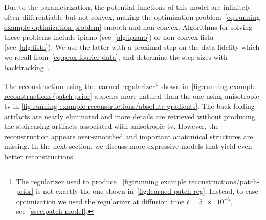 Due to the parametrization, the potential functions of this model are infinitely often differentiable but not convex, making the optimization problem~\cref{eq:running example optimization problem} smooth and non-convex.
Algorithms for solving these problems include \gls{ipiano} (see~\cref{alg:ipiano}) or non-convex \gls{fista} (see~\cref{alg:fista}).
We use the latter with a proximal step on the data fidelity which we recall from~\cref{eq:prox fourier data}, and determine the step sizes with backtracking~\cite{beck_fista_2009,ochs_ipiano_2014}.

The reconstruction using the learned regularizer\footnote{%
	The regularizer used to produce ~\cref{fig:running example reconstructions/patch-prior} is not exactly the one shown in~\cref{fig:learned patch reg}.
	Instead, to ease optimization we used the regularizer at diffusion time \( t = \num{5e-5}\), see~\cref{ssec:patch model}.%
} shown in~\cref{fig:running example reconstructions/patch-prior} appears more natural than the one using anisotropic \gls{tv} in \cref{fig:running example reconstructions/absolute-gradients}.
The back-folding artifacts are nearly eliminated and more details are retrieved without producing the staircasing artifacts associated with anisotropic \gls{tv}.
However, the reconstruction appears over-smoothed and important anatomical structures are missing.
In the next section, we discuss more expressive models that yield even better reconstructions.

